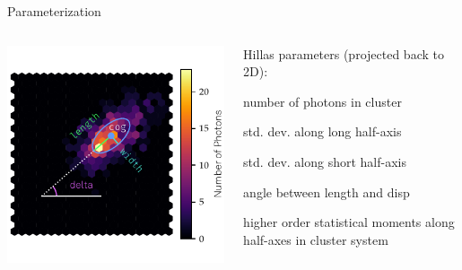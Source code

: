 \begin{frame}[t]{Parameterization}
\begin{columns}[onlytextwidth]
    \begin{column}{0.475\textwidth}
        \vspace{20px}
        \includegraphics[width=\textwidth]{fig/hillas_2.pdf}
    \end{column}
    \begin{column}{0.475\textwidth}
    Hillas parameters (projected back to 2D): \\
        \begin{description}
            \item[size] number of photons in cluster
            \item[length] std. dev. along long half-axis
            \item[width] std. dev. along short half-axis
            \item[delta] angle between length and disp
            \item[skewness/ kurtosis] higher order statistical moments along half-axes in cluster system
        \end{description}
    \end{column}
\end{columns}
\end{frame}

